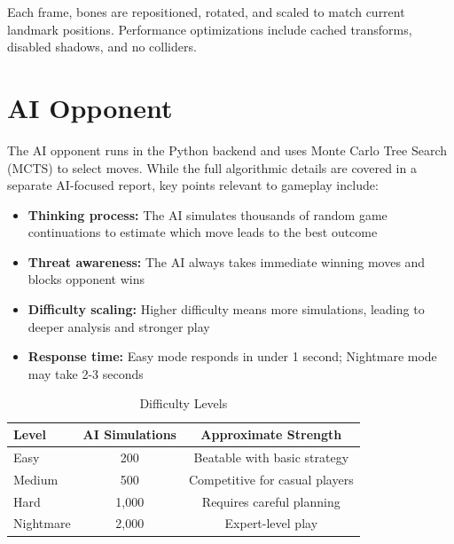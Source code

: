 \documentclass[11pt]{article}
\begin{document}
Each frame, bones are repositioned, rotated, and scaled to match current landmark positions. Performance optimizations include cached transforms, disabled shadows, and no colliders.


\section{AI Opponent}

The AI opponent runs in the Python backend and uses Monte Carlo Tree Search (MCTS) to select moves. While the full algorithmic details are covered in a separate AI-focused report, key points relevant to gameplay include:

\begin{itemize}
    \item \textbf{Thinking process:} The AI simulates thousands of random game continuations to estimate which move leads to the best outcome
    \item \textbf{Threat awareness:} The AI always takes immediate winning moves and blocks opponent wins
    \item \textbf{Difficulty scaling:} Higher difficulty means more simulations, leading to deeper analysis and stronger play
    \item \textbf{Response time:} Easy mode responds in under 1 second; Nightmare mode may take 2-3 seconds
\end{itemize}

\begin{table}[H]
\centering
\caption{Difficulty Levels}
\begin{tabular}{lcc}
\toprule
\textbf{Level} & \textbf{AI Simulations} & \textbf{Approximate Strength} \\
\midrule
Easy & 200 & Beatable with basic strategy \\
Medium & 500 & Competitive for casual players \\
Hard & 1,000 & Requires careful planning \\
Nightmare & 2,000 & Expert-level play \\
\bottomrule
\end{tabular}
\end{table}
\end{document}
